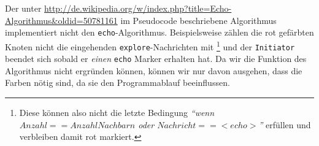 Der unter
\url{http://de.wikipedia.org/w/index.php?title=Echo-Algorithmus&oldid=50781161} im
Pseudocode 
beschriebene Algorithmus implementiert nicht den \verb+echo+-Algorithmus.
Beispielsweise zählen die rot gefärbten Knoten nicht die eingehenden
\verb+explore+-Nachrichten mit
\footnote{Diese können also nicht die letzte Bedingung \emph{``wenn $Anzahl == AnzahlNachbarn$ oder $Nachricht == <echo>$''} erfüllen und verbleiben
damit rot markiert.}
und der \verb+Initiator+ beendet sich sobald er \emph{einen} \verb+echo+ Marker erhalten hat.
Da wir die Funktion des Algorithmus nicht ergründen können, können wir nur davon
ausgehen, dass die Farben nötig sind, da sie den Programmablauf beeinflussen.

